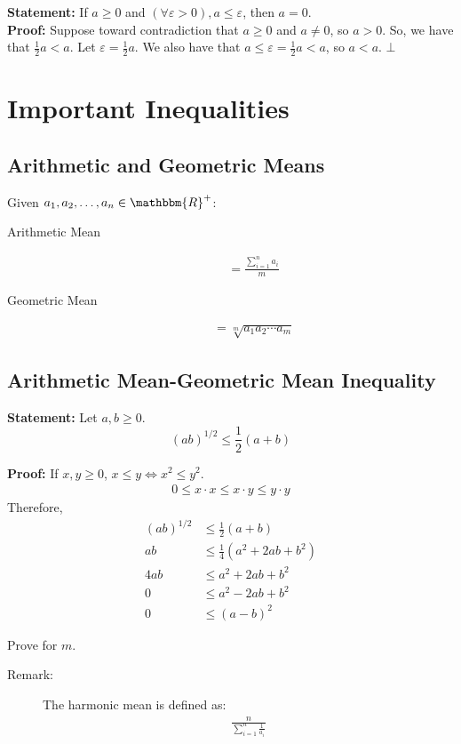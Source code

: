 \documentclass[10pt]{extarticle}
\newcommand{\R}{\mathbbm{R}}
\begin{document}
    \textbf{Statement:} If $a\geq 0$ and $(\forall \varepsilon > 0), a\leq \varepsilon$, then $a=0$.\\

    \textbf{Proof:} Suppose toward contradiction that $a\geq 0$ and $a\neq 0$, so $a > 0$. So, we have that $\frac{1}{2}a < a$. Let $\varepsilon = \frac{1}{2}a$. We also have that $a \leq \varepsilon = \frac{1}{2}a < a$, so $a<a$. $\bot$
  \section{Important Inequalities}%
  \subsection{Arithmetic and Geometric Means}%
    Given $a_1,a_2,\dots,a_n\in \R^+$:
    \begin{description}
      \item[Arithmetic Mean]
    \begin{align*}
      &= \frac{\sum_{i =1}^{n} a_i}{m}
    \end{align*}
    \end{description}
    \begin{description}
      \item[Geometric Mean]
    \begin{align*}
      &= \sqrt[m]{a_1a_2\cdots a_m}
    \end{align*}
    \end{description}
    \subsection{Arithmetic Mean-Geometric Mean Inequality}%
    \textbf{Statement:} Let $a,b \geq 0$.
      \[
        (ab)^{1/2} \leq \frac{1}{2}(a+b)
      \] 

      \textbf{Proof:} If $x,y \geq 0$, $x\leq y \Leftrightarrow x^2 \leq y^2$.
      \begin{align*}
          0 \leq x\cdot x \leq x \cdot y \leq y\cdot y\tag*{by property (ii) of ordered fields}
      \end{align*}
      Therefore,  
      \begin{align*}
        (ab)^{1/2}&\leq \frac{1}{2}(a+b)\\
        ab &\leq \frac{1}{4}(a^2 + 2ab + b^2)\\
        4ab &\leq a^2 + 2ab + b^2 \\
        0 &\leq a^2 - 2ab + b^2\\
        0 &\leq (a-b)^2 \tag*{by definition}
      \end{align*}
      \begin{description}
        \small
        \item[Challenge:] Prove for $m$.
      \end{description}
    \begin{description}
      \item[Remark:] The harmonic mean is defined as:
    \begin{align*}
      \frac{n}{\displaystyle\sum_{i=1}^{n}\frac{1}{a_i}}
    \end{align*}
    \end{description}
\end{document}
